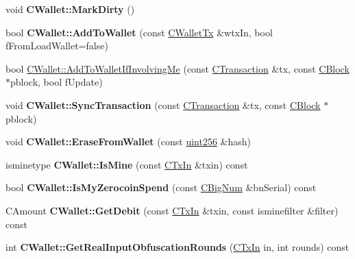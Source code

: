 \begin{DoxyCompactItemize}
void {\bfseries C\+Wallet\+::\+Mark\+Dirty} ()
\item 
\mbox{\label{group__map_wallet_gadf34c789fd6eab1eeed22ef16837f558}} 
bool {\bfseries C\+Wallet\+::\+Add\+To\+Wallet} (const \mbox{\hyperlink{class_c_wallet_tx}{C\+Wallet\+Tx}} \&wtx\+In, bool f\+From\+Load\+Wallet=false)
\item 
bool \mbox{\hyperlink{group__map_wallet_ga487f7cba517d37d24e5fa422711574d9}{C\+Wallet\+::\+Add\+To\+Wallet\+If\+Involving\+Me}} (const \mbox{\hyperlink{class_c_transaction}{C\+Transaction}} \&tx, const \mbox{\hyperlink{class_c_block}{C\+Block}} $\ast$pblock, bool f\+Update)
\item 
\mbox{\label{group__map_wallet_gaac999a0c557887b371bd8d9efaa6ea93}} 
void {\bfseries C\+Wallet\+::\+Sync\+Transaction} (const \mbox{\hyperlink{class_c_transaction}{C\+Transaction}} \&tx, const \mbox{\hyperlink{class_c_block}{C\+Block}} $\ast$pblock)
\item 
\mbox{\label{group__map_wallet_ga43dc1cf73c622cca29e530130e648470}} 
void {\bfseries C\+Wallet\+::\+Erase\+From\+Wallet} (const \mbox{\hyperlink{classuint256}{uint256}} \&hash)
\item 
\mbox{\label{group__map_wallet_ga4eada57edc1c443564b8cc9b853d955c}} 
isminetype {\bfseries C\+Wallet\+::\+Is\+Mine} (const \mbox{\hyperlink{class_c_tx_in}{C\+Tx\+In}} \&txin) const
\item 
\mbox{\label{group__map_wallet_ga0eab42ce08ccd8ed0cea28c67ec20d89}} 
bool {\bfseries C\+Wallet\+::\+Is\+My\+Zerocoin\+Spend} (const \mbox{\hyperlink{class_c_big_num}{C\+Big\+Num}} \&bn\+Serial) const
\item 
\mbox{\label{group__map_wallet_ga5ab4855aac6f4b335421944403e44d6d}} 
C\+Amount {\bfseries C\+Wallet\+::\+Get\+Debit} (const \mbox{\hyperlink{class_c_tx_in}{C\+Tx\+In}} \&txin, const isminefilter \&filter) const
\item 
\mbox{\label{group__map_wallet_ga3807ce5af5bd5f9f01dc08aba7fe3e85}} 
int {\bfseries C\+Wallet\+::\+Get\+Real\+Input\+Obfuscation\+Rounds} (\mbox{\hyperlink{class_c_tx_in}{C\+Tx\+In}} in, int rounds) const

\end{DoxyCompactItemize}
